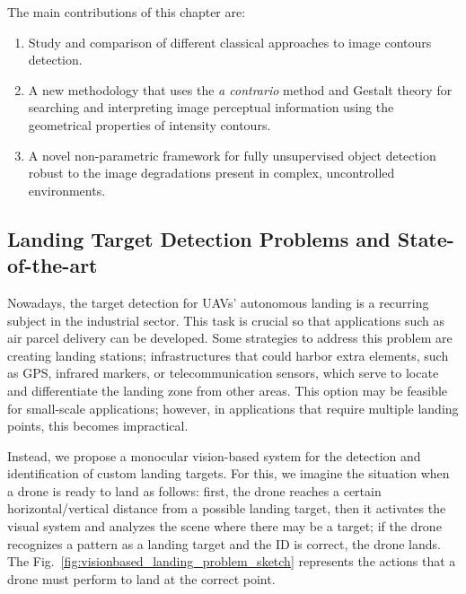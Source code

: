 The main contributions of this chapter are:

\begin{enumerate}
	\item Study and comparison of different classical approaches to image contours detection.
	\item A new methodology that uses the \textit{a contrario} method and Gestalt theory for searching and interpreting image perceptual information using the geometrical properties of intensity contours.	
	\item A novel non-parametric framework for fully unsupervised object detection robust to the image degradations present in complex, uncontrolled environments.

\end{enumerate}

\subsection{Landing Target Detection Problems and State-of-the-art}
Nowadays, the target detection for UAVs' autonomous landing is a recurring subject in the industrial sector. This task is crucial so that applications such as air parcel delivery can be developed. Some strategies to address this problem are creating landing stations; infrastructures that could harbor extra elements, such as GPS, infrared markers, or telecommunication sensors, which serve to locate and differentiate the landing zone from other areas. This option may be feasible for small-scale applications; however, in applications that require multiple landing points, this becomes impractical.

Instead, we propose a monocular vision-based system for the detection and identification of custom landing targets. For this, we imagine the situation when a drone is ready to land as follows: first, the drone reaches a certain horizontal/vertical distance from a possible landing target, then it activates the visual system and analyzes the scene where there may be a target; if the drone recognizes a pattern as a landing target and the ID is correct, the drone lands. The Fig.\ \ref{fig:visionbased_landing_problem_sketch} represents the actions that a drone must perform to land at the correct point. %

